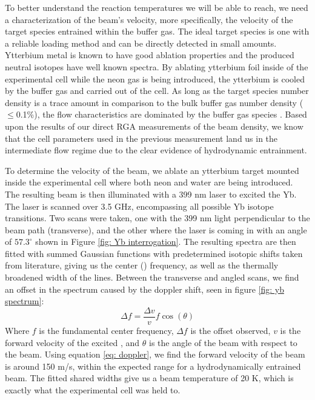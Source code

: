 To better understand the reaction temperatures we will be able to reach, we need a characterization of the beam's velocity, more specifically, the velocity of the target species entrained within the buffer gas. The ideal target species is one with a reliable loading method and can be directly detected in small amounts. Ytterbium metal is known to have good ablation properties and the produced neutral isotopes have well known spectra. By ablating ytterbium foil inside of the experimental cell while the neon gas is being introduced, the ytterbium is cooled by the buffer gas and carried out of the cell. As long as the target species number density is a trace amount in comparison to the bulk buffer gas number density ($\leq$0.1\%), the flow characteristics are dominated by the buffer gas species \cite{Hutzler2012}. Based upon the results of our direct RGA measurements of the beam density, we know that the cell parameters used in the previous measurement land us in the intermediate flow regime due to the clear evidence of hydrodynamic entrainment.

To determine the velocity of the beam, we ablate an ytterbium target mounted inside the experimental cell where both neon and water are being introduced. The resulting beam is then illuminated with a 399 nm laser to excited the Yb. The laser is scanned over 3.5 GHz, encompassing all possible Yb isotope transitions. Two scans were taken, one with the 399 nm light perpendicular to the beam path (transverse), and the other where the laser is coming in with an angle of $57.3^\circ$ shown in Figure \ref{fig: Yb interrogation}. The resulting spectra are then fitted with summed Gaussian functions with predetermined isotopic shifts taken from literature, giving us the center () frequency, as well as the thermally broadened width of the lines. Between the transverse and angled scans, we find an offset in the spectrum caused by the doppler shift, seen in figure \ref{fig: yb spectrum}:
\begin{equation}
	\Delta f = \frac{\Delta v}{v} f \cos(\theta)
	\label{eq: doppler}
\end{equation}
Where $f$ is the fundamental center frequency, $\Delta f$ is the offset observed, $v$ is the forward velocity of the excited , and $\theta$ is the angle of the beam with respect to the beam. Using equation \ref{eq: doppler}, we find the forward velocity of the beam is around 150 m/s, within the expected range for a hydrodynamically entrained beam. The fitted shared widths give us a beam temperature of 20 K, which is exactly what the experimental cell was held to.

